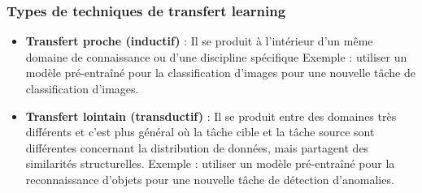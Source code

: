 \subsubsection{Types de techniques de transfert learning}
\begin{itemize}[label=$\bullet$] 

\item \textbf{Transfert proche (inductif)} : Il se produit à l’intérieur d’un même domaine de connaissance ou d’une discipline spécifique
Exemple : utiliser un modèle pré-entraîné pour la classification d'images pour une nouvelle tâche de classification d'images.

\item \textbf{Transfert lointain (transductif)} : Il se produit entre des domaines très différents et c'est plus général où la tâche cible et la tâche source sont différentes concernant la distribution de données, mais partagent des similarités structurelles.
Exemple : utiliser un modèle pré-entraîné pour la reconnaissance d'objets pour une nouvelle tâche de détection d'anomalies.

\end{itemize}



